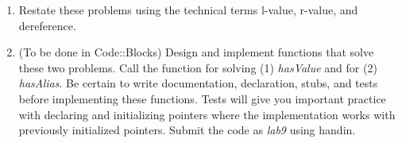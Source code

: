 \documentclass[10pt]{article}
\begin{document}
\begin{enumerate}
\begin{enumerate}
\item Restate these problems using the technical terms l-value, r-value, and dereference.  
\vspace{2in}
\item (To be done in Code::Blocks) Design and implement functions that solve these two problems. Call the function for solving (1) \textit{hasValue} and for (2) \textit{hasAlias}. Be certain to write documentation, declaration, stubs, and tests before implementing these functions. Tests will give you important practice with declaring and initializing pointers where the implementation works with previously initialized pointers. Submit the code as \textit{lab9} using handin.

\end{enumerate}


\end{enumerate}
\end{document}
